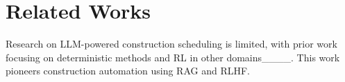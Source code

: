 \section{Related Works}
Research on LLM-powered construction scheduling is limited, with prior work focusing on deterministic methods and RL in other domains____. This work pioneers construction automation using RAG and RLHF.

%